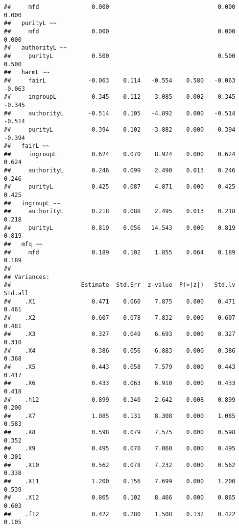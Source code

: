 \documentclass[english,man]{apa6}
\newcounter{author}
\theoremstyle{definition}
\theoremstyle{definition}
\theoremstyle{definition}
\theoremstyle{remark}
\begin{document}
\begin{verbatim}
##     mfd               0.000                               0.000    0.000
##   purityL ~~                                                            
##     mfd               0.000                               0.000    0.000
##   authorityL ~~                                                         
##     purityL           0.500                               0.500    0.500
##   harmL ~~                                                              
##     fairL            -0.063    0.114   -0.554    0.580   -0.063   -0.063
##     ingroupL         -0.345    0.112   -3.085    0.002   -0.345   -0.345
##     authorityL       -0.514    0.105   -4.892    0.000   -0.514   -0.514
##     purityL          -0.394    0.102   -3.882    0.000   -0.394   -0.394
##   fairL ~~                                                              
##     ingroupL          0.624    0.070    8.924    0.000    0.624    0.624
##     authorityL        0.246    0.099    2.490    0.013    0.246    0.246
##     purityL           0.425    0.087    4.871    0.000    0.425    0.425
##   ingroupL ~~                                                           
##     authorityL        0.218    0.088    2.495    0.013    0.218    0.218
##     purityL           0.819    0.056   14.543    0.000    0.819    0.819
##   mfq ~~                                                                
##     mfd               0.189    0.102    1.855    0.064    0.189    0.189
## 
## Variances:
##                    Estimate  Std.Err  z-value  P(>|z|)   Std.lv  Std.all
##    .X1                0.471    0.060    7.875    0.000    0.471    0.461
##    .X2                0.607    0.078    7.832    0.000    0.607    0.481
##    .X3                0.327    0.049    6.693    0.000    0.327    0.310
##    .X4                0.386    0.056    6.883    0.000    0.386    0.368
##    .X5                0.443    0.058    7.579    0.000    0.443    0.417
##    .X6                0.433    0.063    6.910    0.000    0.433    0.418
##    .h12               0.899    0.340    2.642    0.008    0.899    0.200
##    .X7                1.085    0.131    8.308    0.000    1.085    0.583
##    .X8                0.598    0.079    7.575    0.000    0.598    0.352
##    .X9                0.495    0.070    7.060    0.000    0.495    0.301
##    .X10               0.562    0.078    7.232    0.000    0.562    0.338
##    .X11               1.200    0.156    7.699    0.000    1.200    0.539
##    .X12               0.865    0.102    8.466    0.000    0.865    0.603
##    .f12               0.422    0.280    1.508    0.132    0.422    0.105

\end{verbatim}
\end{document}
